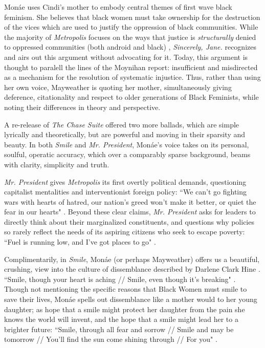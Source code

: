 \documentclass[a4paper, 11pt]{article} %
\begin{document}
Mon\'ae uses Cindi's mother to embody central themes of first wave black feminism.
She believes that black women must take ownership for the destruction of the vices which are used to justify the oppression of black communities. 
While the majority of \emph{Metropolis} focuses on the ways that justice is \emph{structurally} denied to oppressed communities (both android and black) \cite{queen}, \emph{Sincerely, Jane.} recognizes and airs out this argument without advocating for it.
Today, this argument is thought to paralell the lines of the Moynihan report: insufficient and misdirected as a mechanism for the resolution of systematic injustice. 
Thus, rather than using her own voice, Mayweather is quoting her mother, simultaneously giving deference, citationality and respect to older generations of Black Feminists, while noting their differences in theory and perspective.

A re-release of \emph{The Chase Suite} offered two more ballads, which are simple lyrically and theoretically, but are powerful and moving in their sparsity and beauty.
In both \emph{Smile} and \emph{Mr. President}, Mon\'ae's voice takes on its personal, soulful, operatic accuracy, which over a comparably sparse background, beams with clarity, simplicity and truth.

\emph{Mr. President} gives \emph{Metropolis} its first overtly political demands, questioning capitalist mentalities and interventionist foreign policy: 
``We can't go fighting wars with hearts of hatred, our nation's greed won't make it better, or quiet the fear in our hearts" \cite{mrpresident}.
Beyond these clear claims, \emph{Mr. President} asks for leaders to directly think about their marginalized constituents, and questions why policies so rarely reflect the needs of its aspiring citizens who seek to escape poverty:
``Fuel is running low, and I've got places to go" \cite{mrpresident}.

Complimentarily, in \emph{Smile}, Mon\'ae (or perhaps Mayweather) offers us a beautiful, crushing, view into the culture of dissemblance described by Darlene Clark Hine \cite{hine}.
``Smile, though your heart is aching // Smile, even though it's breaking" \cite{smile}.
Though not mentioning the specific reasons that Black Women must smile to save their lives, Mon\'ae spells out dissemblance like a mother would to her young daughter; as hope that a smile might protect her daughter from the pain she knows the world will invent, and the hope that a smile might lead her to a brighter future:
``Smile, through all fear and sorrow // Smile and may be tomorrow // You'll find the sun come shining through // For you" \cite{smile}.
\end{document}
